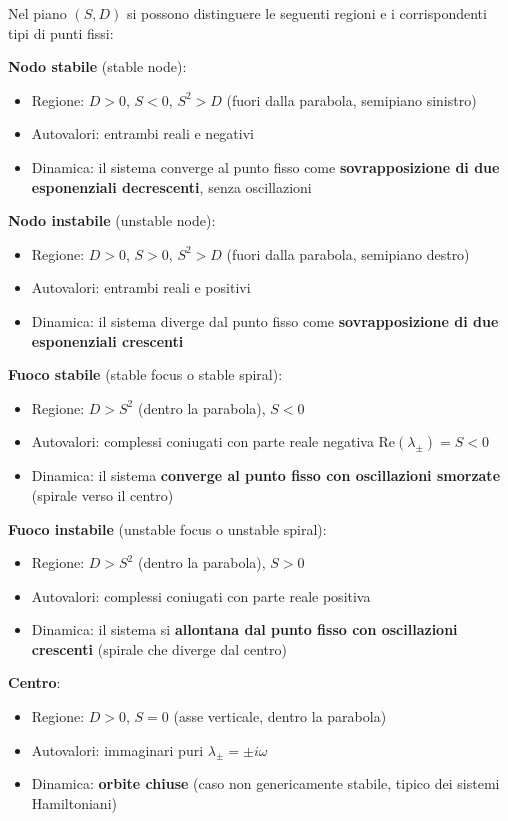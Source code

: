 Nel piano $(S, D)$ si possono distinguere le seguenti regioni e i corrispondenti tipi di punti fissi:

\textbf{Nodo stabile} (stable node):
\begin{itemize}
    \item Regione: $D > 0$, $S < 0$, $S^2 > D$ (fuori dalla parabola, semipiano sinistro)
    \item Autovalori: entrambi reali e negativi
    \item Dinamica: il sistema converge al punto fisso come \textbf{sovrapposizione di due esponenziali decrescenti}, senza oscillazioni
\end{itemize}

\textbf{Nodo instabile} (unstable node):
\begin{itemize}
    \item Regione: $D > 0$, $S > 0$, $S^2 > D$ (fuori dalla parabola, semipiano destro)
    \item Autovalori: entrambi reali e positivi
    \item Dinamica: il sistema diverge dal punto fisso come \textbf{sovrapposizione di due esponenziali crescenti}
\end{itemize}

\textbf{Fuoco stabile} (stable focus o stable spiral):
\begin{itemize}
    \item Regione: $D > S^2$ (dentro la parabola), $S < 0$
    \item Autovalori: complessi coniugati con parte reale negativa $\text{Re}(\lambda_\pm) = S < 0$
    \item Dinamica: il sistema \textbf{converge al punto fisso con oscillazioni smorzate} (spirale verso il centro)
\end{itemize}

\textbf{Fuoco instabile} (unstable focus o unstable spiral):
\begin{itemize}
    \item Regione: $D > S^2$ (dentro la parabola), $S > 0$
    \item Autovalori: complessi coniugati con parte reale positiva
    \item Dinamica: il sistema si \textbf{allontana dal punto fisso con oscillazioni crescenti} (spirale che diverge dal centro)
\end{itemize}

\textbf{Centro}:
\begin{itemize}
    \item Regione: $D > 0$, $S = 0$ (asse verticale, dentro la parabola)
    \item Autovalori: immaginari puri $\lambda_\pm = \pm i\omega$
    \item Dinamica: \textbf{orbite chiuse} (caso non genericamente stabile, tipico dei sistemi Hamiltoniani)
\end{itemize}

